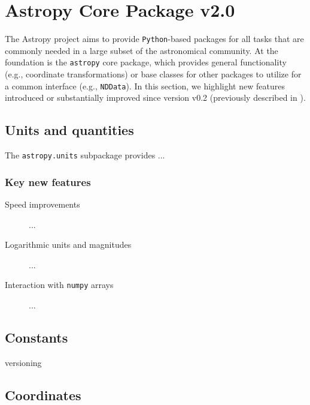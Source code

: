 \documentclass[modern]{aastex61}
\newcommand{\package}[1]{\texttt{#1}\xspace}
\newcommand{\python}{\package{Python}\xspace}
\newcommand{\astropy}{Astropy\xspace}
\newcommand{\astropypkg}{\package{astropy}\xspace}
\begin{document}
\section{Astropy Core Package v2.0}
\label{sec:core}

The \astropy project aims to provide \python-based packages for all tasks that
are commonly needed in a large subset of the astronomical community.
At the foundation is the \astropypkg core package, which provides general
functionality (e.g., coordinate transformations) or base classes for other
packages to utilize for a common interface (e.g., \texttt{NDData}).
In this section, we highlight new features introduced or substantially improved
since version v0.2 (previously described in \citealt{astropy}).


\subsection{Units and quantities}
\label{sec:units}

The \package{astropy.units} subpackage provides ...

\subsubsection{Key new features}

\begin{description}
    \item[Speed improvements] ...
    \item[Logarithmic units and magnitudes] ...
    \item[Interaction with \package{numpy} arrays] ...
\end{description}

\subsection{Constants}
versioning


\subsection{Coordinates}
\label{sec:coordinates}
\end{document}
